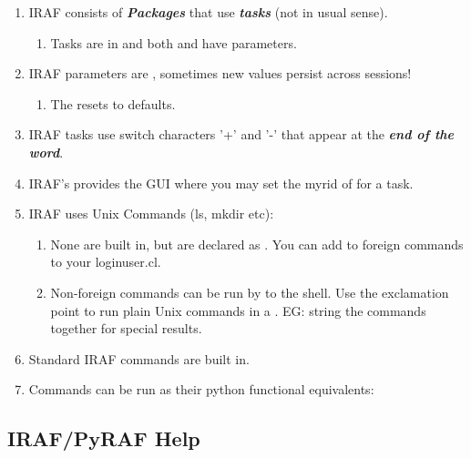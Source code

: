 \vspace{-.15cm}
\begin{enumerate}\addtolength{\itemsep}{-0.5\baselineskip}
   \item   IRAF consists of \textbf{\emph{Packages}} that use \textbf{\emph{tasks}} (not  in usual sense).
\vspace{-.15cm}
    \begin{enumerate}\addtolength{\itemsep}{-0.5\baselineskip}
         \item   Tasks are in  and both  and  have parameters.
    \end{enumerate}
   \item   IRAF parameters are , sometimes new values persist across sessions!
\vspace{-.15cm}
\begin{enumerate}\addtolength{\itemsep}{-0.5\baselineskip}
   \item   The  resets to defaults.
\end{enumerate}

   \item   IRAF tasks use switch characters '+' and '-' that appear at the \textbf{\emph{end of the word}}.
   \item   IRAF's provides the  GUI where you may set the myrid of  for a task.
   \item   IRAF uses Unix Commands (ls, mkdir etc):
\vspace{-.15cm}
\begin{enumerate}\addtolength{\itemsep}{-0.5\baselineskip}
   \item   None are built in, but are declared as . You can add to \gls{foreign} commands to your loginuser.cl.
   \item   Non-foreign commands can be run by  to the shell. Use the exclamation point \llbox{!}
   to run plain Unix commands in a . EG: string the commands  together
   for special results.
\end{enumerate}
   \item   Standard IRAF commands are built in.
   \item   Commands can be run as their python functional equivalents:
\end{enumerate}

\newpage
\subsection{IRAF/PyRAF Help} \label{sec:IRAF_PYRAF_Help}


